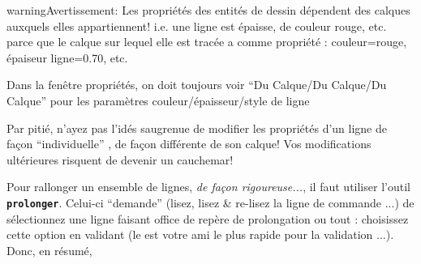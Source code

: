 \documentclass[a4paper,12pt,french]{sphinxmanual}
\begin{document}
\begin{notice}{warning}{Avertissement:}
Les propriétés des entités de dessin dépendent des calques auxquels elles appartiennent! i.e. une ligne est épaisse, de couleur rouge, etc. parce que le calque sur lequel elle est tracée a comme propriété : couleur=rouge, épaiseur ligne=0.70, etc.
\begin{quote}


\end{quote}

Dans la fenêtre propriétés, on doit toujours voir ``Du Calque/Du Calque/Du Calque'' pour les paramètres couleur/épaisseur/style de ligne

Par pitié, n'ayez pas l'idés saugrenue de modifier les propriétés d'un ligne de façon ``individuelle'' , de façon différente de son calque! Vos modifications ultérieures risquent de devenir un cauchemar!
\end{notice}

Pour rallonger un ensemble de lignes, \emph{de façon rigoureuse...}, il faut utiliser l'outil \textbf{\texttt{prolonger}}. Celui-ci ``demande'' (lisez, lisez \& re-lisez la ligne de commande ...) de sélectionnez une ligne faisant office de repère de prolongation ou tout : choisissez cette option en validant (le  est votre ami le plus rapide pour la validation ...). Donc, en résumé, 
\end{document}
